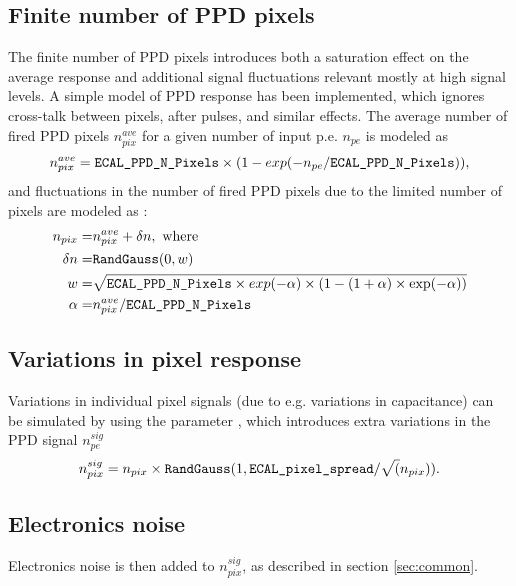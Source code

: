 \documentclass[12pt]{article} %
\begin{document}
\subsection*{Finite number of PPD pixels}
The finite number of PPD pixels introduces both a saturation effect on the average response and additional signal 
fluctuations relevant mostly at high signal levels. 
A simple model of PPD response has been implemented, which ignores cross-talk between pixels, 
after pulses, and similar effects.
The average number of fired PPD pixels ${n}_{pix}^{ave}$ for a given number of input p.e. $n_{pe}$ is modeled as
\begin{equation*}
{n}_{pix}^{ave} = \text{\tt ECAL\_PPD\_N\_Pixels} \times ( 1 - exp ( -n_{pe} / \text{\tt ECAL\_PPD\_N\_Pixels}  ) ), 
\end{equation*}
and fluctuations in the number of fired PPD pixels due to the limited number of pixels are modeled as \cite{PPD}:
\begin{equation*}
\begin{split}
n_{pix} = & {n}_{pix}^{ave} + \delta n, \text{ where} \\
\delta n = & \text{\tt RandGauss}( 0, w ) \\
       w = & \sqrt{\text{\tt ECAL\_PPD\_N\_Pixels} \times exp(-\alpha) \times ( 1 - (1+\alpha) \times \exp ( - \alpha ) ) } \\
       \alpha = & n_{pix}^{ave} / \text{\tt ECAL\_PPD\_N\_Pixels}
\end{split}
\end{equation*}

\subsection*{Variations in pixel response}
Variations in individual pixel signals (due to e.g. variations in capacitance) can be simulated by using the parameter
, which introduces extra variations in the PPD signal $n_{pe}^{sig}$
\begin{equation*}
n_{pix}^{sig} = n_{pix} \times \text{\tt RandGauss} ( 1, \text{\tt ECAL\_pixel\_spread} / \sqrt( n_{pix} ) ).
\end{equation*}

\subsection*{Electronics noise}
Electronics noise is then added to $n_{pix}^{sig}$, as described in section \ref{sec:common}.
\end{document}
